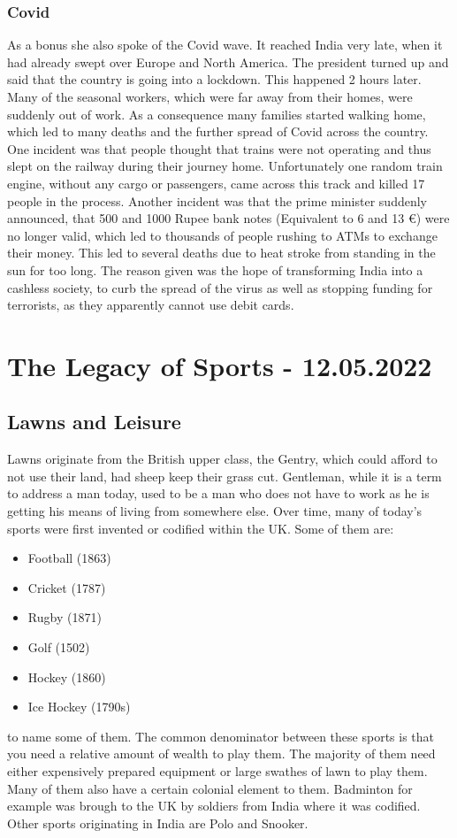 \documentclass{article}
\begin{document}
	\subsubsection{Covid}
	As a bonus she also spoke of the Covid wave. It reached India very late, when it had already swept over Europe and North America. The president turned up and said that the country is going into a lockdown. This happened 2 hours later. Many of the seasonal workers, which were far away from their homes, were suddenly out of work. As a consequence many families started walking home, which led to many deaths and the further spread of Covid across the country. One incident was that people thought that trains were not operating and thus slept on the railway during their journey home. Unfortunately one random train engine, without any cargo or passengers, came across this track and killed 17 people in the process. Another incident was that the prime minister suddenly announced, that 500 and 1000 Rupee bank notes (Equivalent to 6 and 13 €) were no longer valid, which led to thousands of people rushing to ATMs to exchange their money. This led to several deaths due to heat stroke from standing in the sun for too long. The reason given was the hope of transforming India into a cashless society, to curb the spread of the virus as well as stopping funding for terrorists, as they apparently cannot use debit cards.

	\section{The Legacy of Sports - 12.05.2022}
	
	\subsection{Lawns and Leisure}
	Lawns originate from the British upper class, the Gentry, which could afford to not use their land, had sheep keep their grass cut. Gentleman, while it is a term to address a man today, used to be a man who does not have to work as he is getting his means of living from somewhere else. Over time, many of today's sports were first invented or codified within the UK. Some of them are:
	\begin{itemize}
		\item{Football (1863)}
		\item{Cricket (1787)}
		\item{Rugby (1871)}
		\item{Golf (1502)}
		\item{Hockey (1860)}
		\item{Ice Hockey (1790s)}
	\end{itemize}
	to name some of them. The common denominator between these sports is that you need a relative amount of wealth to play them. The majority of them need either expensively prepared equipment or large swathes of lawn to play them. \\
	Many of them also have a certain colonial element to them. Badminton for example was brough to the UK by soldiers from India where it was codified. Other sports originating in India are Polo and Snooker.
\end{document}
